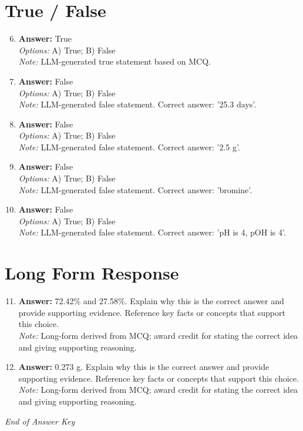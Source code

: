 \documentclass[12pt]{article}
\begin{document}
\section*{True / False}
\begin{enumerate}[label=\arabic*.]
\setcounter{enumi}{5}
\item \textbf{Answer:} True
\\ \textit{Options:} A) True; B) False
\\ \textit{Note:} LLM-generated true statement based on MCQ.
\item \textbf{Answer:} False
\\ \textit{Options:} A) True; B) False
\\ \textit{Note:} LLM-generated false statement. Correct answer: '25.3 days'.
\item \textbf{Answer:} False
\\ \textit{Options:} A) True; B) False
\\ \textit{Note:} LLM-generated false statement. Correct answer: '2.5 g'.
\item \textbf{Answer:} False
\\ \textit{Options:} A) True; B) False
\\ \textit{Note:} LLM-generated false statement. Correct answer: 'bromine'.
\item \textbf{Answer:} False
\\ \textit{Options:} A) True; B) False
\\ \textit{Note:} LLM-generated false statement. Correct answer: 'pH is 4, pOH is 4'.
\end{enumerate}

\section*{Long Form Response}
\begin{enumerate}[label=\arabic*.]
\setcounter{enumi}{10}
\item \textbf{Answer:} 72.42\% and 27.58\%. Explain why this is the correct answer and provide supporting evidence. Reference key facts or concepts that support this choice.
\\ \textit{Note:} Long-form derived from MCQ; award credit for stating the correct idea and giving supporting reasoning.
\item \textbf{Answer:} 0.273 g. Explain why this is the correct answer and provide supporting evidence. Reference key facts or concepts that support this choice.
\\ \textit{Note:} Long-form derived from MCQ; award credit for stating the correct idea and giving supporting reasoning.
\end{enumerate}

\vfill
\noindent\textit{End of Answer Key}
\end{document}
